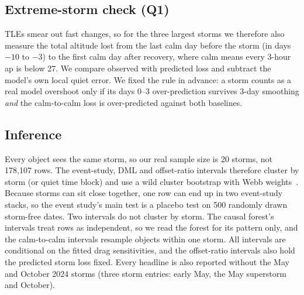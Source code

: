 \subsection{Extreme-storm check (Q1)}
TLEs smear out fast changes, so for the three largest storms we therefore also measure the total altitude lost
from the last calm day before the storm (in days $-10$ to $-3$) to the first calm day after
recovery, where calm means every 3-hour ap is below 27. We compare observed with predicted loss
and subtract the model's own local quiet error. We fixed the rule in advance: a storm counts as
a real model overshoot only if its days 0--3 over-prediction survives 3-day smoothing
\emph{and} the calm-to-calm loss is over-predicted against both baselines.

\subsection{Inference}
Every object sees the same storm, so our real sample size is 20 storms, not 178,107 rows. The
event-study, DML and offset-ratio intervals therefore cluster by storm (or quiet time block) and
use a wild cluster bootstrap with Webb weights~\cite{cameron2008bootstrap,webb2023wild}. Because
storms can sit close together, one row can end up in two event-study stacks, so the event
study's main test is a placebo test on 500 randomly drawn storm-free dates. Two intervals do not
cluster by storm. The causal forest's intervals treat rows as independent, so we read the forest
for its pattern only, and the calm-to-calm intervals resample objects within one storm. All
intervals are conditional on the fitted drag sensitivities, and the offset-ratio intervals also
hold the predicted storm loss fixed. Every headline is also reported without the May and October
2024 storms (three storm entries: early May, the May superstorm and October).
